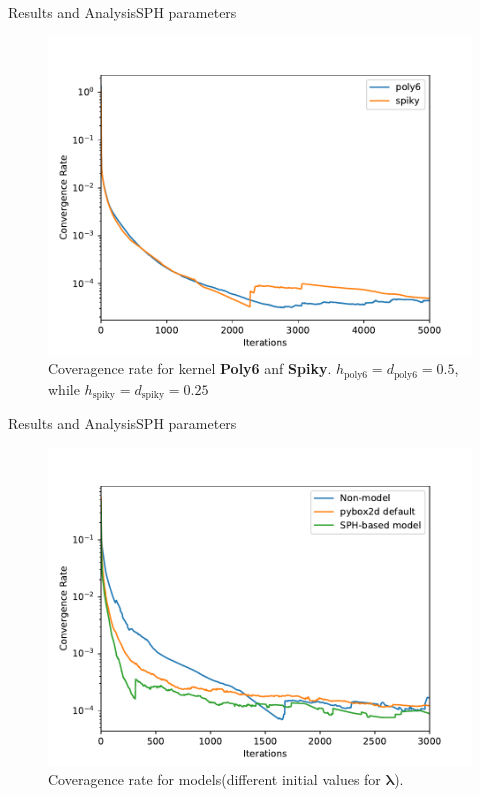 \documentclass{beamer}
\begin{document}
\begin{frame}{Results and Analysis}{SPH parameters}
\begin{figure}[!ht]{}
        \centering
        \includegraphics[scale=0.4]{../report/Figures/kerneltest.pdf}
        \caption{Coveragence rate for kernel \textbf{Poly6} anf \textbf{Spiky}. $h_\text{poly6} = d_\text{poly6} = 0.5$, while $h_\text{spiky} = d_\text{spiky} = 0.25$}
\end{figure}
\end{frame}

\begin{frame}{Results and Analysis}{SPH parameters}
\begin{figure}[!ht]
        \centering
        \includegraphics[scale=0.4]{../report/Figures/final_SPH.pdf}
        \caption{Coveragence rate for models(different initial values for $\pmb{\lambda}$).}
\end{figure}
\end{frame}
\end{document}
